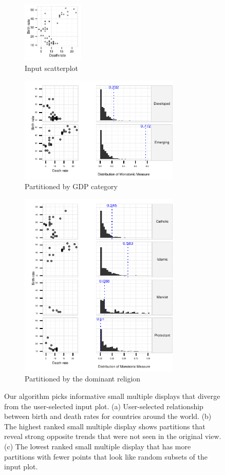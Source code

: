 \begin{figure}[t]
 \centering 
	 \begin{subfigure}{1.15in}
        \centering
		\includegraphics[width=1.15in]{images/DEATH_RT-BIRTH_RT.pdf}
		  \caption{Input scatterplot}
		 \label{fig:informative_all}
	\end{subfigure}
	\begin{subfigure}{3in}
		\includegraphics[width=3in]{images/9_95670214716782-GDP.pdf}
		  \caption{Partitioned by GDP category}
		 \label{fig:informative}
	 \end{subfigure}
	 \begin{subfigure}{3in}
		\includegraphics[width=3in]{images/3_80130820585327-LEADER.pdf}
		  \caption{Partitioned by the dominant religion}
		 \label{fig:not_informative}
	 \end{subfigure}
	  \caption{Our algorithm picks informative small multiple displays that diverge from the user-selected input plot. (a) User-selected relationship between birth and death rates for countries around the world. (b) The highest ranked small multiple display shows partitions that reveal strong opposite trends that were not seen in the original view. (c) The lowest ranked small multiple display that has more partitions with fewer points that look like random subsets of the input plot.}
\end{figure}

